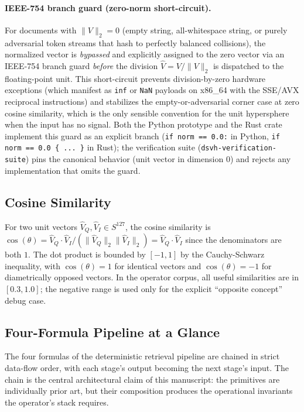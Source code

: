 \documentclass[10pt,twocolumn]{article}
\theoremstyle{definition}
\theoremstyle{remark}
\begin{document}
\paragraph{IEEE-754 branch guard (zero-norm short-circuit).}
For documents with $\|V\|_2 = 0$ (empty string, all-whitespace
string, or purely adversarial token streams that hash to perfectly
balanced collisions), the normalized vector is \emph{bypassed} and
explicitly assigned to the zero vector via an IEEE-754 branch guard
\emph{before} the division $\hat{V} = V / \|V\|_2$ is dispatched to
the floating-point unit. This short-circuit prevents division-by-zero
hardware exceptions (which manifest as \texttt{inf} or \texttt{NaN}
payloads on x86\_64 with the SSE/AVX reciprocal instructions) and
stabilizes the empty-or-adversarial corner case at zero cosine
similarity, which is the only sensible convention for the unit
hypersphere when the input has no signal. Both the Python prototype
and the Rust crate implement this guard as an explicit branch
(\texttt{if norm == 0.0:} in Python, \texttt{if norm == 0.0 \{ ... \}}
in Rust); the verification suite
(\texttt{dsvh-verification-suite}) pins the canonical behavior
(unit vector in dimension 0) and rejects any implementation that
omits the guard.

\subsection{Cosine Similarity}

For two unit vectors $\hat{V}_Q, \hat{V}_I \in S^{127}$, the cosine
similarity is $\cos(\theta) = \hat{V}_Q \cdot \hat{V}_I / (\|\hat{V}_Q\|_2
\|\hat{V}_I\|_2) = \hat{V}_Q \cdot \hat{V}_I$ since the denominators are
both $1$. The dot product is bounded by $[-1, 1]$ by the Cauchy-Schwarz
inequality, with $\cos(\theta) = 1$ for identical vectors and $\cos(\theta)
= -1$ for diametrically opposed vectors. In the operator corpus, all
useful similarities are in $[0.3, 1.0]$; the negative range is used only
for the explicit ``opposite concept'' debug case.

\subsection{Four-Formula Pipeline at a Glance}

The four formulas of the deterministic retrieval pipeline are chained
in strict data-flow order, with each stage's output becoming the next
stage's input. The chain is the central architectural claim of this
manuscript: the primitives are individually prior art, but their
composition produces the operational invariants the operator's stack
requires.
\end{document}
